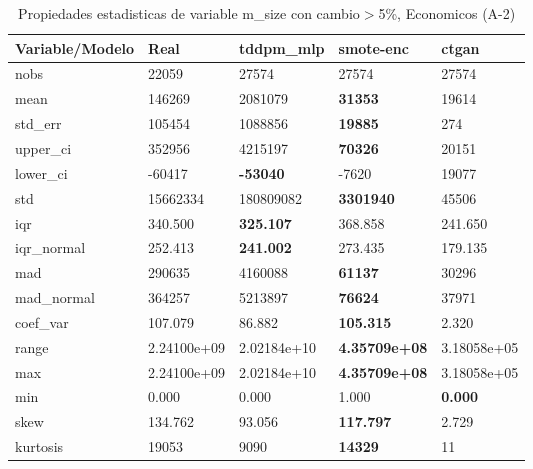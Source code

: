 \begin{table}[H]
\centering
\fontsize{8}{14}\selectfont
\caption{Propiedades estadisticas de variable m\_size con cambio\ensuremath{>}5\%, Economicos (A-2)}
\label{table-stats-economicos-a-2-m_size-short}
\begin{tabular}{|l|m{10em}|m{10em}|m{10em}|m{10em}|}
\hline
 \rowcolor[gray]{0.8}
Variable/Modelo & Real & tddpm\_mlp & smote-enc & ctgan \\
\hline nobs & 22059 & 27574 & 27574 & 27574 \\
\hline mean & 146269 & \cellcolor[rgb]{0.9, 0.54, 0.52} 2081079 & \bfseries 31353 & 19614 \\
\hline std\_err & 105454 & \cellcolor[rgb]{0.9, 0.54, 0.52} 1088856 & \bfseries 19885 & 274 \\
\hline upper\_ci & 352956 & \cellcolor[rgb]{0.9, 0.54, 0.52} 4215197 & \bfseries 70326 & 20151 \\
\hline lower\_ci & -60417 & \bfseries -53040 & -7620 & \cellcolor[rgb]{0.9, 0.54, 0.52} 19077 \\
\hline std & 15662334 & \cellcolor[rgb]{0.9, 0.54, 0.52} 180809082 & \bfseries 3301940 & 45506 \\
\hline iqr & 340.500 & \bfseries 325.107 & 368.858 & \cellcolor[rgb]{0.9, 0.54, 0.52} 241.650 \\
\hline iqr\_normal & 252.413 & \bfseries 241.002 & 273.435 & \cellcolor[rgb]{0.9, 0.54, 0.52} 179.135 \\
\hline mad & 290635 & \cellcolor[rgb]{0.9, 0.54, 0.52} 4160088 & \bfseries 61137 & 30296 \\
\hline mad\_normal & 364257 & \cellcolor[rgb]{0.9, 0.54, 0.52} 5213897 & \bfseries 76624 & 37971 \\
\hline coef\_var & 107.079 & 86.882 & \bfseries 105.315 & \cellcolor[rgb]{0.9, 0.54, 0.52} 2.320 \\
\hline range & 2.24100e+09 & \cellcolor[rgb]{0.9, 0.54, 0.52} 2.02184e+10 & \bfseries 4.35709e+08 & 3.18058e+05 \\
\hline max & 2.24100e+09 & \cellcolor[rgb]{0.9, 0.54, 0.52} 2.02184e+10 & \bfseries 4.35709e+08 & 3.18058e+05 \\
\hline min & 0.000 & 0.000 & \cellcolor[rgb]{0.9, 0.54, 0.52} 1.000 & \bfseries 0.000 \\
\hline skew & 134.762 & 93.056 & \bfseries 117.797 & \cellcolor[rgb]{0.9, 0.54, 0.52} 2.729 \\
\hline kurtosis & 19053 & 9090 & \bfseries 14329 & \cellcolor[rgb]{0.9, 0.54, 0.52} 11 \\

\end{tabular}
\end{table}
